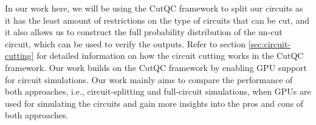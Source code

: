 In our work here, we will be using the CutQC framework to split our circuits as it has the least amount of restrictions on the type of circuits that can be cut, and it also allows us to construct the full probability distribution of the un-cut circuit, which can be used to verify the outputs. Refer to section \ref{sec:circuit-cutting} for detailed information on how the circuit cutting works in the CutQC framework. Our work builds on the CutQC framework by enabling GPU support for circuit simulations. Our work mainly aims to compare the performance of both approaches, i.e., circuit-splitting and full-circuit simulations, when GPUs are used for simulating the circuits and gain more insights into the pros and cons of both approaches.
